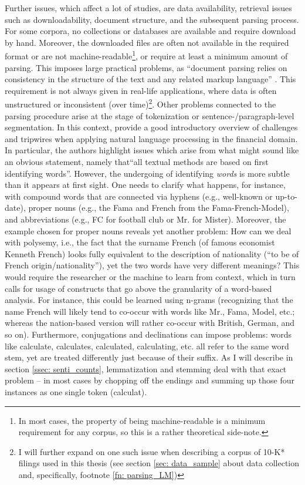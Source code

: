 Further issues, which affect a lot of studies, are data availability, retrieval issues such as downloadability, document structure, and the subsequent parsing process. For some corpora, no collections or databases are available and require download by hand. Moreover, the downloaded files are often not available in the required format or are not machine-readable\footnote{In most cases, the property of being machine-readable is a minimum requirement for any corpus, so this is a rather theoretical side-note.}, or require at least a minimum amount of parsing. This imposes large practical problems, as \enquote{document parsing relies on consistency in the structure of the text and any related markup language} \parencite[1192]{LM-meta-2016}. This requirement is not always given in real-life applications, where data is often unstructured or inconsistent (over time)\footnote{I will further expand on one such issue when describing a corpus of 10-K* filings used in this thesis (see section \ref{sec: data_sample} about data collection and, specifically, footnote \ref{fn: parsing_LM})}. Other problems connected to the parsing procedure arise at the stage of tokenization or sentence-/paragraph-level segmentation. In this context, \textcite[1215]{LM-meta-2016} provide a good introductory overview of challenges and tripwires when applying natural language processing in the financial domain. In particular, the authors highlight issues which arise from what might sound like an obvious statement, namely that\enquote{all textual methods are based on first identifying words}. However, the undergoing of identifying \textit{words} is more subtle than it appears at first sight. One needs to clarify what happens, for instance, with compound words that are connected via hyphens (e.g., \textsf{well-known} or \textsf{up-to-date}), proper nouns (e.g., the \textsf{Fama} and \textsf{French} from the Fama-French-Model), and abbreviations (e.g., \textsf{FC} for football club or \textsf{Mr.} for Mister). Moreover, the example chosen for proper nouns reveals yet another problem: How can we deal with polysemy, i.e., the fact that the surname \textsf{French} (of famous economist Kenneth French) looks fully equivalent to the description of nationality (\enquote{to be of \textsf{French} origin/nationality}), yet the two words have very different meanings? This would require the researcher or the machine to learn from context, which in turn calls for usage of constructs that go above the granularity of a word-based analysis. For instance, this could be learned using n-grams (recognizing that the name \textsf{French} will likely tend to co-occur with words like \textsf{Mr.}, \textsf{Fama}, \textsf{Model}, etc.; whereas the nation-based version will rather co-occur with \textsf{British}, \textsf{German}, and so on). Furthermore, conjugations and declinations can impose problems: words like \textsf{calculate, calculates, calculated, calculating}, etc. all refer to the same word stem, yet are treated differently just because of their suffix. As I will describe in section \ref{ssec: senti_counts}, lemmatization and stemming deal with that exact problem -- in most cases by chopping off the endings and summing up those four instances as one single token (\textsf{calculat}). 

